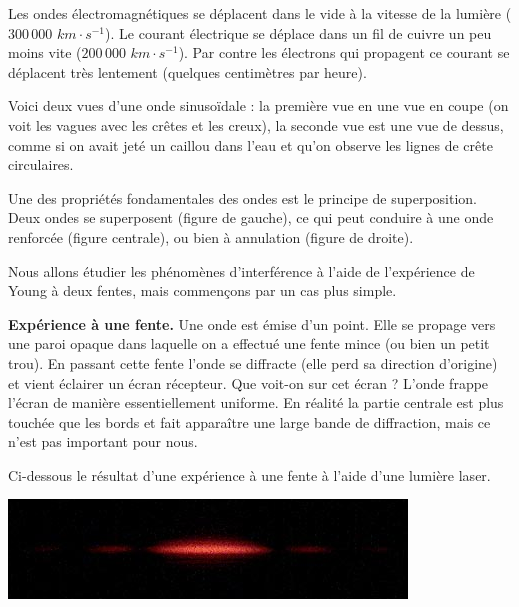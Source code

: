 \documentclass[11pt,class=report,crop=false]{standalone}
\begin{document}
Les ondes électromagnétiques se déplacent dans le vide à la vitesse de la lumière ($300\,000$ $km \cdot s^{-1}$). Le courant électrique se déplace dans un fil de cuivre un peu moins vite ($200\,000$ $km \cdot s^{-1}$). Par contre les électrons qui propagent ce courant se déplacent très lentement (quelques centimètres par heure).


\bigskip

Voici deux vues d'une onde sinusoïdale : la première vue en une vue en coupe (on voit les vagues avec les crêtes et les creux), la seconde vue est une vue de dessus, comme si on avait jeté un caillou dans l'eau et qu'on observe les lignes de crête circulaires.



Une des propriétés fondamentales des ondes est le principe de superposition.
Deux ondes se superposent (figure de gauche), ce qui peut conduire à une onde renforcée (figure centrale), ou bien à annulation (figure de droite).



Nous allons étudier les phénomènes d'interférence à l'aide de l'expérience de Young à deux fentes, mais commençons par un cas plus simple.

\textbf{Expérience à une fente.}
Une onde est émise d'un point. Elle se propage vers une paroi opaque dans laquelle on a effectué une fente mince (ou bien un petit trou). En passant cette fente l'onde se diffracte (elle perd sa direction d'origine) et vient éclairer un écran récepteur.
Que voit-on sur cet écran ? L'onde frappe l'écran de manière essentiellement uniforme. En réalité la partie centrale est plus touchée que les bords et fait apparaître une large bande de diffraction, mais ce n'est pas important pour nous.

Ci-dessous le résultat d'une expérience à une fente à l'aide d'une lumière laser.
\begin{center}
\includegraphics[scale=\myscale,scale=0.9]{figures/fig-une-fente}
\end{center}


\end{document}
